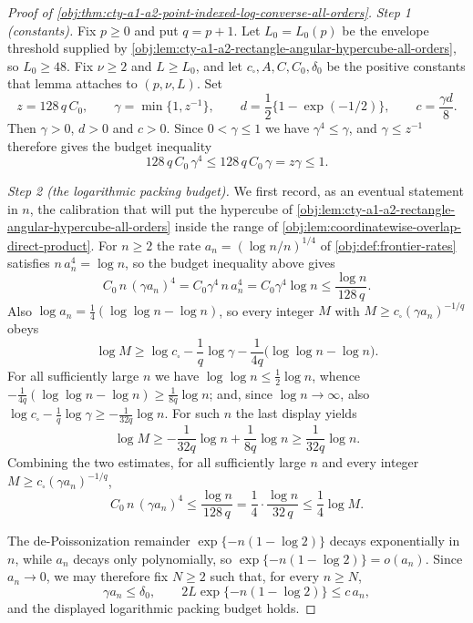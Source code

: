 \documentclass[11pt]{article}
\begin{document}
\begin{proof}[Proof of \cref{obj:thm:cty-a1-a2-point-indexed-log-converse-all-orders}]
\emph{Step 1 (constants).}
Fix \(p\geq 0\) and put \(q=p+1\).  Let \(L_0=L_0(p)\) be the envelope threshold
supplied by \cref{obj:lem:cty-a1-a2-rectangle-angular-hypercube-all-orders}, so
\(L_0\geq 48\).  Fix \(\nu\geq 2\) and \(L\geq L_0\), and let
\(c_\square,A,C,C_0,\delta_0\) be the positive constants that lemma attaches to
\((p,\nu,L)\).  Set
\[
z=128\,q\,C_0,\qquad
\gamma=\min\{1,z^{-1}\},\qquad
d=\frac12\bigl\{1-\exp(-1/2)\bigr\},\qquad
c=\frac{\gamma d}{8}.
\]
Then \(\gamma>0\), \(d>0\) and \(c>0\).  Since \(0<\gamma\leq 1\) we have
\(\gamma^4\leq\gamma\), and \(\gamma\leq z^{-1}\) therefore gives the budget
inequality
\[
128\,q\,C_0\,\gamma^4\leq 128\,q\,C_0\,\gamma= z\gamma\leq 1 .
\]

\emph{Step 2 (the logarithmic packing budget).}
We first record, as an eventual statement in \(n\), the calibration that will
put the hypercube of \cref{obj:lem:cty-a1-a2-rectangle-angular-hypercube-all-orders}
inside the range of \cref{obj:lem:coordinatewise-overlap-direct-product}.  For
\(n\geq2\) the rate \(a_n=(\log n/n)^{1/4}\) of \cref{obj:def:frontier-rates}
satisfies \(n\,a_n^4=\log n\), so the budget inequality above gives
\[
C_0\,n\,(\gamma a_n)^4
=C_0\gamma^4\,n\,a_n^4
=C_0\gamma^4\log n
\leq\frac{\log n}{128\,q}.
\]
Also \(\log a_n=\frac14(\log\log n-\log n)\), so every integer \(M\) with
\(M\geq c_\square(\gamma a_n)^{-1/q}\) obeys
\[
\log M
\geq
\log c_\square-\frac1q\log\gamma
-\frac1{4q}\bigl(\log\log n-\log n\bigr).
\]
For all sufficiently large \(n\) we have \(\log\log n\leq\frac12\log n\), whence
\(-\frac1{4q}(\log\log n-\log n)\geq\frac1{8q}\log n\); and, since
\(\log n\to\infty\), also
\(\log c_\square-\frac1q\log\gamma\geq-\frac1{32q}\log n\).  For such \(n\) the
last display yields
\[
\log M\geq-\frac1{32q}\log n+\frac1{8q}\log n\geq\frac1{32q}\log n .
\]
Combining the two estimates, for all sufficiently large \(n\) and every integer
\(M\geq c_\square(\gamma a_n)^{-1/q}\),
\[
C_0\,n\,(\gamma a_n)^4
\leq\frac{\log n}{128\,q}
=\frac14\cdot\frac{\log n}{32\,q}
\leq\frac14\log M .
\]

The de-Poissonization remainder \(\exp\{-n(1-\log2)\}\) decays exponentially in
\(n\), while \(a_n\) decays only polynomially, so
\(\exp\{-n(1-\log 2)\}=o(a_n)\).
Since \(a_n\to0\), we may therefore fix \(N\geq2\) such that, for every \(n\geq N\),
\[
\gamma a_n\leq\delta_0,
\qquad
2L\exp\{-n(1-\log 2)\}\leq c\,a_n,
\]
and the displayed logarithmic packing budget holds.


\end{proof}
\end{document}
